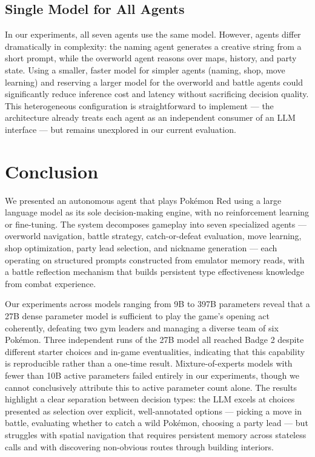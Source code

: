\documentclass{article}
\begin{document}
\subsection{Single Model for All Agents}

In our experiments, all seven agents use the same model. However, agents differ dramatically in complexity: the naming agent generates a creative string from a short prompt, while the overworld agent reasons over maps, history, and party state. Using a smaller, faster model for simpler agents (naming, shop, move learning) and reserving a larger model for the overworld and battle agents could significantly reduce inference cost and latency without sacrificing decision quality. This heterogeneous configuration is straightforward to implement --- the architecture already treats each agent as an independent consumer of an LLM interface --- but remains unexplored in our current evaluation.


\section{Conclusion}
\label{sec:conclusion}

We presented an autonomous agent that plays Pok\'{e}mon Red using a large language model as its sole decision-making engine, with no reinforcement learning or fine-tuning. The system decomposes gameplay into seven specialized agents --- overworld navigation, battle strategy, catch-or-defeat evaluation, move learning, shop optimization, party lead selection, and nickname generation --- each operating on structured prompts constructed from emulator memory reads, with a battle reflection mechanism that builds persistent type effectiveness knowledge from combat experience.

Our experiments across models ranging from 9B to 397B parameters reveal that a 27B dense parameter model is sufficient to play the game's opening act coherently, defeating two gym leaders and managing a diverse team of six Pok\'{e}mon. Three independent runs of the 27B model all reached Badge 2 despite different starter choices and in-game eventualities, indicating that this capability is reproducible rather than a one-time result. Mixture-of-experts models with fewer than 10B active parameters failed entirely in our experiments, though we cannot conclusively attribute this to active parameter count alone. The results highlight a clear separation between decision types: the LLM excels at choices presented as selection over explicit, well-annotated options --- picking a move in battle, evaluating whether to catch a wild Pok\'{e}mon, choosing a party lead --- but struggles with spatial navigation that requires persistent memory across stateless calls and with discovering non-obvious routes through building interiors.
\end{document}
